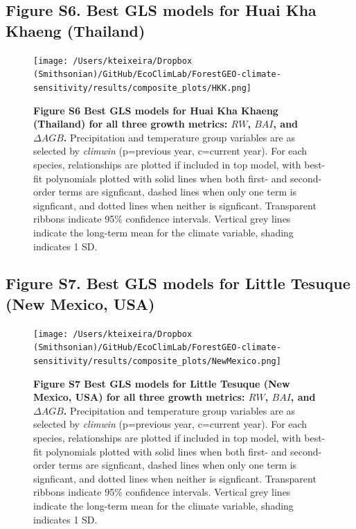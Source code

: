 \documentclass[
]{article}
\begin{document}
\newpage

\hypertarget{figure-s6.-best-gls-models-for-huai-kha-khaeng-thailand}{%
\subsection{Figure S6. Best GLS models for Huai Kha Khaeng
(Thailand)}\label{figure-s6.-best-gls-models-for-huai-kha-khaeng-thailand}}

\begin{figure}
\centering
\texttt{[image: /Users/kteixeira/Dropbox (Smithsonian)/GitHub/EcoClimLab/ForestGEO-climate-sensitivity/results/composite\_plots/HKK.png]}
\caption{\textbf{Figure S6 \textbar{} Best GLS models for Huai Kha
Khaeng (Thailand) for all three growth metrics: \(RW\), \(BAI\), and
\(\Delta AGB\).} Precipitation and temperature group variables are as
selected by \emph{climwin} (p=previous year, c=current year). For each
species, relationships are plotted if included in top model, with
best-fit polynomials plotted with solid lines when both first- and
second-order terms are signficant, dashed lines when only one term is
signficant, and dotted lines when neither is signficant. Transparent
ribbons indicate 95\% confidence intervals. Vertical grey lines indicate
the long-term mean for the climate variable, shading indicates 1 SD.}
\end{figure}

\newpage

\hypertarget{figure-s7.-best-gls-models-for-little-tesuque-new-mexico-usa}{%
\subsection{Figure S7. Best GLS models for Little Tesuque (New Mexico,
USA)}\label{figure-s7.-best-gls-models-for-little-tesuque-new-mexico-usa}}

\begin{figure}
\centering
\texttt{[image: /Users/kteixeira/Dropbox (Smithsonian)/GitHub/EcoClimLab/ForestGEO-climate-sensitivity/results/composite\_plots/NewMexico.png]}
\caption{\textbf{Figure S7 \textbar{} Best GLS models for Little Tesuque
(New Mexico, USA) for all three growth metrics: \(RW\), \(BAI\), and
\(\Delta AGB\).} Precipitation and temperature group variables are as
selected by \emph{climwin} (p=previous year, c=current year). For each
species, relationships are plotted if included in top model, with
best-fit polynomials plotted with solid lines when both first- and
second-order terms are signficant, dashed lines when only one term is
signficant, and dotted lines when neither is signficant. Transparent
ribbons indicate 95\% confidence intervals. Vertical grey lines indicate
the long-term mean for the climate variable, shading indicates 1 SD.}
\end{figure}
\end{document}
